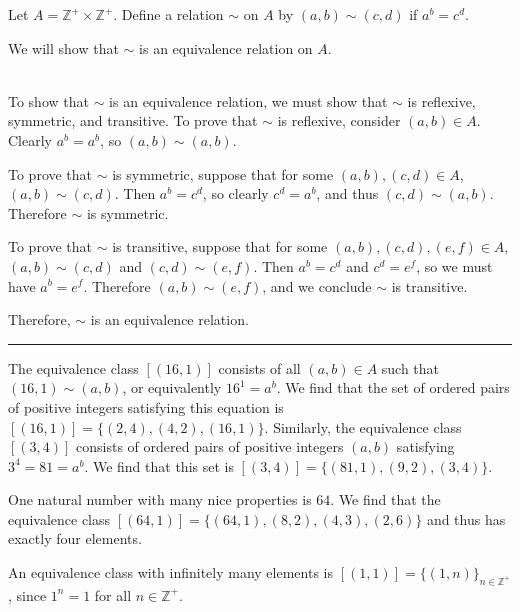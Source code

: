 \documentclass[11pt]{hmcpset}
\newenvironment{problem2}[1]{\noindent {\bf (#1}}
{\medskip}
\newenvironment{problem1}[1]{\noindent {\bf Problem #1}}
{\medskip}
\newenvironment{proof}{\noindent {\bf Proof:} \\}{\hfill
\rule{1mm}{3mm} \bigskip}
\begin{document}
\begin{problem1}{2.} Let $A=\mathbb{Z}^+\times\mathbb{Z}^+$. Define a relation $\sim$ on $A$ by $(a,b)\sim(c,d)$ if $a^b=c^d$.
\end{problem1}

\begin{problem2}{a)} We will show that $\sim$ is an equivalence relation on $A$.

\begin{proof}\indent To show that $\sim$ is an equivalence relation, we must show that $\sim$ is reflexive, symmetric, and transitive. To prove that $\sim$ is reflexive, consider $(a,b)\in A$. Clearly $a^b=a^b$, so $(a,b)\sim(a,b)$.

To prove that $\sim$ is symmetric, suppose that for some $(a,b),(c,d)\in A$, $(a,b)\sim(c,d)$. Then $a^b=c^d$, so clearly $c^d=a^b$, and thus $(c,d)\sim(a,b)$. Therefore $\sim$ is symmetric.

To prove that $\sim$ is transitive, suppose that for some $(a,b),(c,d),(e,f)\in A$, $(a,b)\sim(c,d)$ and $(c,d)\sim(e,f)$. Then $a^b=c^d$ and $c^d=e^f$, so we must have $a^b=e^f$. Therefore $(a,b)\sim(e,f)$, and we conclude $\sim$ is transitive.

Therefore, $\sim$ is an equivalence relation.
\end{proof}
\end{problem2}

\begin{problem2}{b)} The equivalence class $[(16,1)]$ consists of all $(a,b)\in A$ such that $(16,1)\sim(a,b)$, or equivalently $16^1=a^b$. We find that the set of ordered pairs of positive integers satisfying this equation is $[(16,1)]=\{(2,4),(4,2),(16,1)\}$. Similarly, the equivalence class $[(3,4)]$ consists of ordered pairs of positive integers $(a,b)$ satisfying $3^4=81=a^b$. We find that this set is $[(3,4)]=\{(81,1),(9,2),(3,4)\}$.
\end{problem2}

\begin{problem2}{c)} One natural number with many nice properties is $64$. We find that the equivalence class $[(64,1)]=\{(64,1),(8,2),(4,3),(2,6)\}$ and thus has exactly four elements.
\end{problem2}

\begin{problem2}{d)} An equivalence class with infinitely many elements is $[(1,1)]=\{(1,n)\}_{n\in\mathbb{Z}^+}$, since $1^n=1$ for all $n\in\mathbb{Z}^+$.
\end{problem2}
\end{document}
